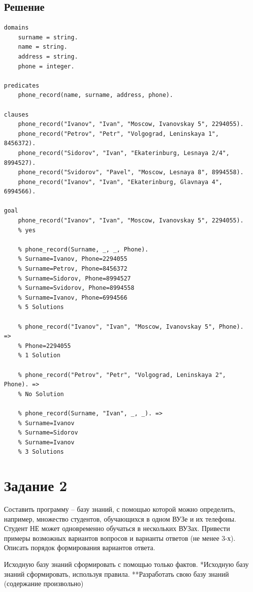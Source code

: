 \documentclass[12pt]{report}
\begin{document}
\subsection*{Решение}
\begin{lstlisting}
domains
	surname = string.
	name = string.
	address = string.
	phone = integer.

predicates
	phone_record(name, surname, address, phone).

clauses
	phone_record("Ivanov", "Ivan", "Moscow, Ivanovskay 5", 2294055).
	phone_record("Petrov", "Petr", "Volgograd, Leninskaya 1", 8456372).
	phone_record("Sidorov", "Ivan", "Ekaterinburg, Lesnaya 2/4", 8994527).
	phone_record("Svidorov", "Pavel", "Moscow, Lesnaya 8", 8994558).
	phone_record("Ivanov", "Ivan", "Ekaterinburg, Glavnaya 4", 6994566).

goal
	phone_record("Ivanov", "Ivan", "Moscow, Ivanovskay 5", 2294055).
	% yes

	% phone_record(Surname, _, _, Phone). 
	% Surname=Ivanov, Phone=2294055
	% Surname=Petrov, Phone=8456372
	% Surname=Sidorov, Phone=8994527
	% Surname=Svidorov, Phone=8994558
	% Surname=Ivanov, Phone=6994566
	% 5 Solutions
	
	% phone_record("Ivanov", "Ivan", "Moscow, Ivanovskay 5", Phone). => 
	% Phone=2294055
	% 1 Solution
	
	% phone_record("Petrov", "Petr", "Volgograd, Leninskaya 2", Phone). =>
	% No Solution
	
	% phone_record(Surname, "Ivan", _, _). =>
	% Surname=Ivanov
	% Surname=Sidorov
	% Surname=Ivanov
	% 3 Solutions
\end{lstlisting}

\section*{Задание 2}

Составить программу – базу знаний, с помощью которой можно определить, например, множество студентов, обучающихся в одном ВУЗе и их телефоны. Студент НЕ может одновременно обучаться в нескольких ВУЗах. Привести примеры возможных вариантов  вопросов и варианты ответов (не менее 3-х). Описать порядок формирования вариантов  ответа.

Исходную базу знаний сформировать с помощью только фактов. 
*Исходную базу знаний сформировать, используя правила.
**Разработать свою базу знаний (содержание произвольно)
\end{document}
